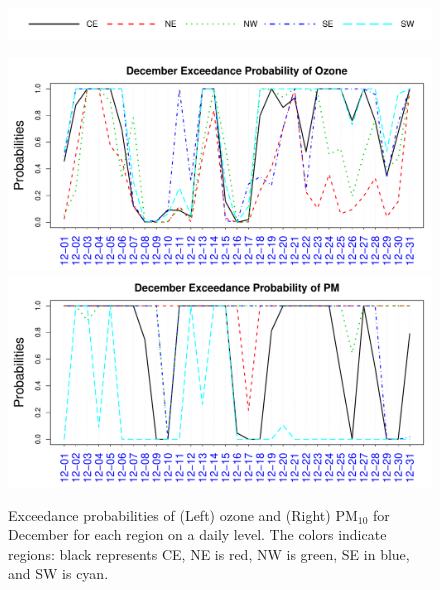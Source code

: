 \documentclass[alpha-refs]{wiley-article}
\begin{document}
\begin{figure}[H]
  \begin{center}
  \hspace{.1\textwidth}
  \includegraphics[width=\textwidth]{phase_reg_legend}

  \vspace{-4mm}

      \includegraphics[width=.45\textwidth]{exceed_prob_O3_dec}
            \includegraphics[width=.45\textwidth]{exceed_prob_PM10_dec}


  \end{center}
  \vspace{-6mm}
       \caption{Exceedance probabilities of (Left) ozone and (Right) $\text{PM}_{10}$ for December for each region on a daily level. The colors indicate regions: black represents CE, NE is red, NW is green, SE in blue, and SW is cyan.}\label{fig:prob_dec_O3}
\end{figure}
\vspace{-3mm}  

%
%

\end{document}
